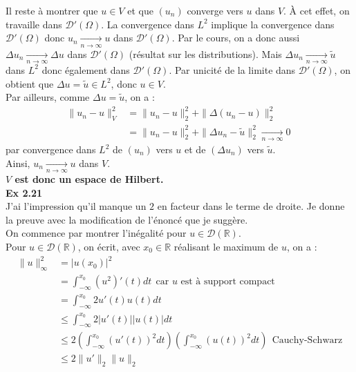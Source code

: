 \documentclass[a4paper,12pt]{article}
\begin{document}
Il reste à montrer que $u \in V$ et que $(u_n)$ converge vers $u$ dans $V$. À cet effet, on travaille dans $\mathcal{D}'(\Omega)$. La convergence dans $L^2$ implique la convergence dans $\mathcal{D}'(\Omega)$ donc $u_n \underset{n \to \infty}{\longrightarrow} u$ dans $\mathcal{D}'(\Omega)$. Par le cours, on a donc aussi $\Delta u_n \underset{n \to \infty}{\longrightarrow} \Delta u$ dans $\mathcal{D}'(\Omega)$ (résultat sur les distributions). Mais $\Delta u_n \underset{n \to \infty}{\longrightarrow} \tilde{u}$ dans $L^2$ donc également dans $\mathcal{D}'(\Omega)$. Par unicité de la limite dans $\mathcal{D}'(\Omega)$, on obtient que $\boxed{\Delta u = \tilde{u} \in L^2}$, donc $u \in V$. \\

Par ailleurs, comme $\Delta u = \tilde{u}$, on a :
\begin{align*}
\|u_n-u\|_V^2 & = \|u_n-u\|_2^2 + \|\Delta (u_n - u)\|_2^2 \\
& = \|u_n-u\|_2^2 + \|\Delta u_n - \tilde{u}\|_2^2 \underset{n \to \infty}{\longrightarrow} 0 \
\end{align*}
par convergence dans $L^2$ de $(u_n)$ vers $u$ et de $(\Delta u_n)$ vers $\tilde{u}$. \\

Ainsi, $u_n \underset{n \to \infty}{\longrightarrow} u$ dans $V$.\\ \textbf{$V$ est donc un espace de Hilbert.} \\

\textbf{Ex 2.21} \\
J'ai l'impression qu'il manque un $2$ en facteur dans le terme de droite. Je donne la preuve avec la modification de l'énoncé que je suggère. \\

On commence par montrer l'inégalité pour $u \in \mathcal{D}(\mathbb{R})$. \\
Pour $u \in \mathcal{D}(\mathbb{R})$, on écrit, avec $x_0 \in \mathbb{R}$ réalisant le maximum de $u$, on a :
\begin{align*}
\|u\|_{\infty}^2 & = |u(x_0)|^2 \\
				& = \int_{- \infty}^{x_0} (u^2)'(t) dt \ \ \text{car }u \text{ est à support compact} \\
			    & = \int_{-\infty}^{x_0} 2u'(t)u(t)dt \\
			    & \leq \int_{-\infty}^{x_0} 2|u'(t)||u(t)|dt \\
			    & \leq 2 \left(\int_{- \infty}^{x_0} (u'(t))^2 dt \right) \left( \int_{- \infty}^{x_0} (u(t))^2 dt \right)  \ \ \text{Cauchy-Schwarz} \\
			    & \boxed{\leq 2 \|u'\|_2 \|u\|_2}
\end{align*}
\end{document}
